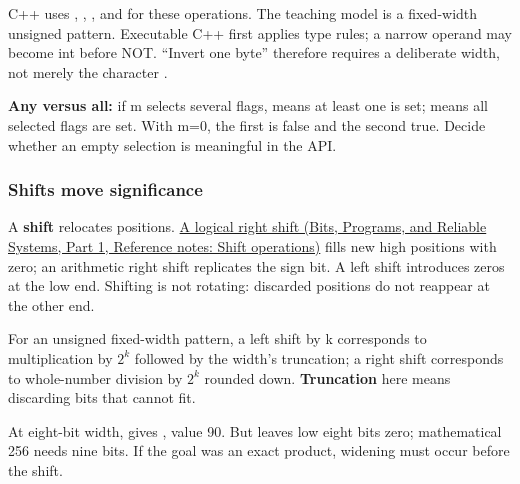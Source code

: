 C++ uses \BookInlineCode{{\&}}{\&}, \BookInlineCode{{\textbar{}}}{\textbar{}}, \BookInlineCode{{\^{}}}{\^{}}, and \BookInlineCode{{\textasciitilde{}}}{\textasciitilde{}} for these operations. The teaching model is a fixed-width unsigned pattern. Executable C++ first applies type rules; a narrow operand may become int before NOT. ``Invert one byte'' therefore requires a deliberate width, not merely the character \BookInlineCode{{\textasciitilde{}}}{\textasciitilde{}}.

\textbf{Any versus all:} if m selects several flags,  means at least one is set;  means all selected flags are set. With m=0, the first is false and the second true. Decide whether an empty selection is meaningful in the API.

\subsubsection{Shifts move significance}\label{05-engine-i-ch001-shifts-move-significance}

\hypertarget{05-engine-i-ch001-shifts-move-significance}{}

A \textbf{shift} relocates positions. \href{../01-Bits-Programs-and-Reliable-Systems-P01/main.pdf\#nameddest=appendix-73425b25118e}{A logical right shift (Bits, Programs, and Reliable Systems, Part 1, Reference notes: Shift operations)} fills new high positions with zero; an arithmetic right shift replicates the sign bit. A left shift introduces zeros at the low end. Shifting is not rotating: discarded positions do not reappear at the other end.

For an unsigned fixed-width pattern, a left shift by k corresponds to multiplication by \(2^k\) followed by the width's truncation; a right shift corresponds to whole-number division by \(2^k\) rounded down. \textbf{Truncation} here means discarding bits that cannot fit.

At eight-bit width,  gives , value 90. But  leaves low eight bits zero; mathematical 256 needs nine bits. If the goal was an exact product, widening must occur before the shift.

